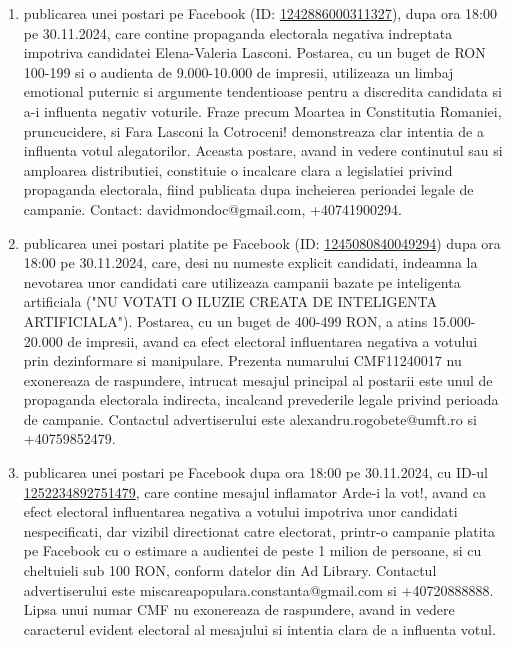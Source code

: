 \documentclass[a4paper,12pt]{article}
\begin{document}
\begin{enumerate}[leftmargin=*, label=\arabic*.)]
    \item publicarea unei postari pe Facebook (ID: \href{https://www.facebook.com/ads/library/?id=1242886000311327}{1242886000311327}), dupa ora 18:00 pe 30.11.2024, care contine propaganda electorala negativa indreptata impotriva candidatei Elena-Valeria Lasconi. Postarea, cu un buget de RON 100-199 si o audienta de 9.000-10.000 de impresii, utilizeaza un limbaj emotional puternic si argumente tendentioase pentru a discredita candidata si a-i influenta negativ voturile.  Fraze precum Moartea in Constitutia Romaniei, pruncucidere, si Fara Lasconi la Cotroceni! demonstreaza clar intentia de a influenta votul alegatorilor.  Aceasta postare, avand in vedere continutul sau si amploarea distributiei, constituie o incalcare clara a legislatiei privind propaganda electorala, fiind publicata dupa incheierea perioadei legale de campanie.  Contact: davidmondoc@gmail.com, +40741900294.
    \item publicarea unei postari platite pe Facebook (ID: \href{https://www.facebook.com/ads/library/?id=1245080840049294}{1245080840049294}) dupa ora 18:00 pe 30.11.2024, care, desi nu numeste explicit candidati, indeamna la nevotarea unor candidati care utilizeaza campanii bazate pe inteligenta artificiala ("NU VOTATI O ILUZIE CREATA DE INTELIGENTA ARTIFICIALA").  Postarea, cu un buget de 400-499 RON, a atins 15.000-20.000 de impresii, avand ca efect electoral influentarea negativa a votului prin dezinformare si manipulare.  Prezenta numarului CMF11240017 nu exonereaza de raspundere, intrucat mesajul principal al postarii este unul de propaganda electorala indirecta, incalcand prevederile legale privind perioada de campanie.  Contactul advertiserului este alexandru.rogobete@umft.ro si +40759852479.
    \item publicarea unei postari pe Facebook dupa ora 18:00 pe 30.11.2024, cu ID-ul \href{https://www.facebook.com/ads/library/?id=1252234892751479}{1252234892751479}, care contine mesajul inflamator Arde-i la vot!, avand ca efect electoral influentarea negativa a votului impotriva unor candidati nespecificati, dar vizibil directionat catre electorat,  printr-o campanie platita pe Facebook cu o estimare a audientei de peste 1 milion de persoane,  si cu cheltuieli sub 100 RON, conform datelor din Ad Library.  Contactul advertiserului este miscareapopulara.constanta@gmail.com si +40720888888.  Lipsa unui numar CMF nu exonereaza de raspundere, avand in vedere caracterul evident electoral al mesajului si intentia clara de a influenta votul.

\end{enumerate}
\end{document}
